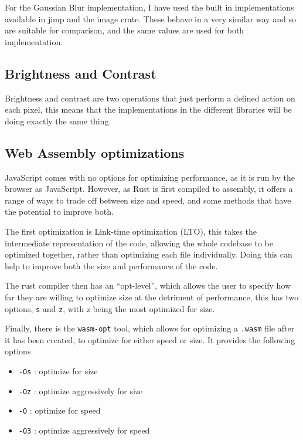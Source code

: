 \documentclass[12pt,a4paper]{article}
\begin{document}
For the Gaussian Blur implementation, I have used the built in implementations available in jimp and the image crate. These behave in a very similar way and so are suitable for comparison, and the same values are used for both implementation.

\subsection{Brightness and Contrast}

Brightness and contrast are two operations that just perform a defined action on each pixel, this means that the implementations in the different libraries will be doing exactly the same thing.

\subsection{Web Assembly optimizations}

JavaScript comes with no options for optimizing performance, as it is run by the browser as JavaScript. However, as Rust is first compiled to assembly, it offers a range of ways to trade off between size and speed, and some methods that have the potential to improve both.

The first optimization is Link-time optimization (LTO), this takes the intermediate representation of the code, allowing the whole codebase to be optimized together, rather than optimizing each file individually. Doing this can help to improve both the size and performance of the code.

The rust compiler then has an “opt-level”, which allows the user to specify how far they are willing to optimize size at the detriment of performance, this has two options, \texttt{s} and \texttt{z}, with z being the most optimized for size.

Finally, there is the \texttt{wasm-opt} tool, which allows for optimizing a \texttt{.wasm} file after it has been created, to optimize for either speed or size. It provides the following options

\begin{itemize}
    \item \texttt{-Os} : optimize for size
    \item \texttt{-Oz} : optimize aggressively for size
    \item \texttt{-O} : optimize for speed
    \item \texttt{-O3} : optimize aggressively for speed
\end{itemize}
\end{document}
